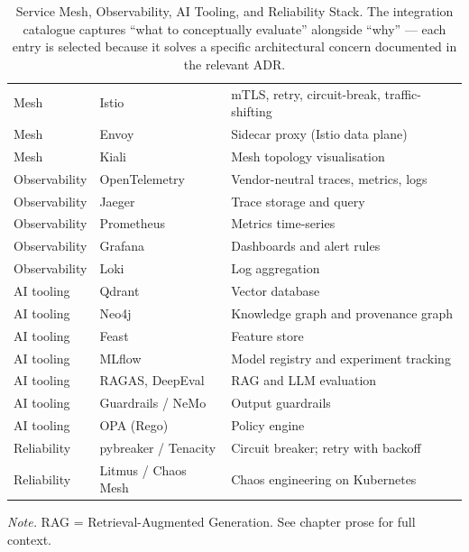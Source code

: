 {\tablestripes\tablefontsize
{}
\begin{xltabular}{\textwidth}{@{} >{\raggedright\arraybackslash}p{2.0cm} >{\raggedright\arraybackslash}p{2.5cm} L @{}}
\caption[Service Mesh, Observability, AI Tooling, and Reliability]{Service Mesh, Observability, AI Tooling, and Reliability Stack. The integration catalogue captures ``what to conceptually evaluate'' alongside ``why'' --- each entry is selected because it solves a specific architectural concern documented in the relevant ADR.}\label{tab:appo_integration_other} \\
\toprule
{} &  &  \\
\midrule
\endfirsthead
\endhead
\bottomrule
\endlastfoot
Mesh & Istio & mTLS, retry, circuit-break, traffic-shifting \\
Mesh & Envoy & Sidecar proxy (Istio data plane) \\
Mesh & Kiali & Mesh topology visualisation \\
Observability & OpenTelemetry & Vendor-neutral traces, metrics, logs \\
Observability & Jaeger & Trace storage and query \\
Observability & Prometheus & Metrics time-series \\
Observability & Grafana & Dashboards and alert rules \\
Observability & Loki & Log aggregation \\
AI tooling & Qdrant & Vector database \\
AI tooling & Neo4j & Knowledge graph and provenance graph \\
AI tooling & Feast & Feature store \\
AI tooling & MLflow & Model registry and experiment tracking \\
AI tooling & RAGAS, DeepEval & RAG and LLM evaluation \\
AI tooling & Guardrails / NeMo & Output guardrails \\
AI tooling & OPA (Rego) & Policy engine \\
Reliability & pybreaker / Tenacity & Circuit breaker; retry with backoff \\
Reliability & Litmus / Chaos Mesh & Chaos engineering on Kubernetes \\
\end{xltabular}}
\vspace{0.3em}\noindent\textit{Note.} RAG = Retrieval-Augmented Generation. See chapter prose for full context.

